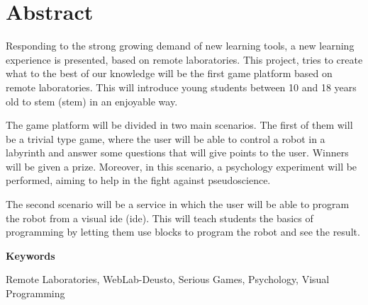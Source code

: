 \chapter*{Abstract}

Responding to the strong growing demand of new learning tools, a new learning experience is
presented, based on remote laboratories. This project, tries to create what to the best of our
knowledge will be the first game platform based on remote laboratories. This will introduce young
students between 10 and 18 years old to \acrshort{stem} (\acrlong{stem}) in an enjoyable way.

The game platform will be divided in two main scenarios. The first of them will be a trivial type
game, where the user will be able to control a robot in a labyrinth and answer some questions that
will give points to the user. Winners will be given a prize. Moreover, in this scenario, a
psychology experiment will be performed, aiming to help in the fight against pseudoscience.

The second scenario will be a service in which the user will be able to program the robot from a
visual \acrshort{ide} (\acrlong{ide}). This will teach students the basics of programming by letting
them use blocks to program the robot and see the result.

\vspace{2em}

{\Large\bfseries\sffamily Keywords}
\vspace{3\medskipamount}

Remote Laboratories, WebLab-Deusto, Serious Games, Psychology, Visual Programming

